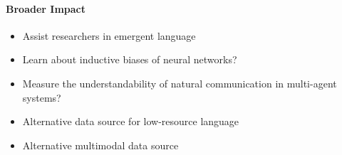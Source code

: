 \paragraph{Broader Impact}
\begin{itemize}
    \item {} Assist researchers in emergent language
    \item {} Learn about inductive biases of neural networks?
    \item {} Measure the understandability of natural communication in multi-agent systems?
    \item {} Alternative data source for low-resource language 
    \item {} Alternative multimodal data source
\end{itemize}
